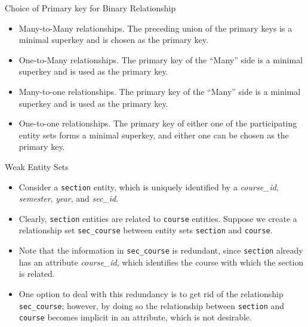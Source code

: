 \documentclass{beamer}
\begin{document}
\begin{frame}{Choice of Primary key for Binary Relationship}
    \begin{itemize}
        \item Many-to-Many relationships. The preceding union of the primary keys is a minimal superkey and is chosen as the primary key.
        \item One-to-Many relationships. The primary key of the ``Many'' side is a minimal superkey and is used as the primary key.
        \item Many-to-one relationships. The primary key of the ``Many'' side is a minimal superkey and is used as the primary key.
        \item One-to-one relationships. The primary key of either one of the participating entity sets forms a minimal superkey, and either one can be chosen as the primary key.
    \end{itemize}
\end{frame}

\begin{frame}{Weak Entity Sets}
    \begin{itemize}
        \item Consider a \texttt{section} entity, which is uniquely identified by a \textit{course\_id}, \textit{semester}, \textit{year}, and \textit{sec\_id}.
        \item Clearly, \texttt{section} entities are related to \texttt{course} entities. Suppose we create a relationship set \texttt{sec\_course} between entity sets \texttt{section} and \texttt{course}.
        \item Note that the information in \texttt{sec\_course} is redundant, since \texttt{section} already has an attribute \textit{course\_id}, which identifies the course with which the section is related.
        \item One option to deal with this redundancy is to get rid of the relationship \texttt{sec\_course}; however, by doing so the relationship between \texttt{section} and \texttt{course} becomes implicit in an attribute, which is not desirable.
    \end{itemize}
\end{frame}
\end{document}
